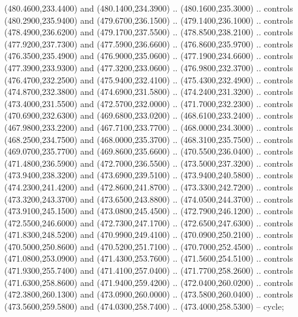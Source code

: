 {\begin{scope}[y=0.80pt, x=0.80pt, yscale=-1, xscale=1, inner sep=0pt, outer sep=0pt, #1]
      (480.4600,233.4400) and (480.1400,234.3900) .. (480.1600,235.3000) .. controls
      (480.2900,235.9400) and (479.6700,236.1500) .. (479.1400,236.1000) .. controls
      (478.4900,236.6200) and (479.1700,237.5500) .. (478.8500,238.2100) .. controls
      (477.9200,237.7300) and (477.5900,236.6600) .. (476.8600,235.9700) .. controls
      (476.3500,235.4900) and (476.9000,235.0600) .. (477.1900,234.6600) .. controls
      (477.3900,233.9300) and (477.3200,233.0600) .. (476.9800,232.3700) .. controls
      (476.4700,232.2500) and (475.9400,232.4100) .. (475.4300,232.4900) .. controls
      (474.8700,232.3800) and (474.6900,231.5800) .. (474.2400,231.3200) .. controls
      (473.4000,231.5500) and (472.5700,232.0000) .. (471.7000,232.2300) .. controls
      (470.6900,232.6300) and (469.6800,233.0200) .. (468.6100,233.2400) .. controls
      (467.9800,233.2200) and (467.7100,233.7700) .. (468.0000,234.3000) .. controls
      (468.2500,234.7500) and (468.0000,235.3700) .. (468.3100,235.7500) .. controls
      (469.0700,235.7700) and (469.8600,235.6600) .. (470.5500,236.0400) .. controls
      (471.4800,236.5900) and (472.7000,236.5500) .. (473.5000,237.3200) .. controls
      (473.9400,238.3200) and (473.6900,239.5100) .. (473.9400,240.5800) .. controls
      (474.2300,241.4200) and (472.8600,241.8700) .. (473.3300,242.7200) .. controls
      (473.3200,243.3700) and (473.6500,243.8800) .. (474.0500,244.3700) .. controls
      (473.9100,245.1500) and (473.0800,245.4500) .. (472.7900,246.1200) .. controls
      (472.5500,246.6000) and (472.7300,247.1700) .. (472.6500,247.6300) .. controls
      (471.8300,248.5200) and (470.9900,249.4100) .. (470.0900,250.2100) .. controls
      (470.5000,250.8600) and (470.5200,251.7100) .. (470.7000,252.4500) .. controls
      (471.0800,253.0900) and (471.4300,253.7600) .. (471.5600,254.5100) .. controls
      (471.9300,255.7400) and (471.4100,257.0400) .. (471.7700,258.2600) .. controls
      (471.6300,258.8600) and (471.9400,259.4200) .. (472.0400,260.0200) .. controls
      (472.3800,260.1300) and (473.0900,260.0000) .. (473.5800,260.0400) .. controls
      (473.5600,259.5800) and (474.0300,258.7400) .. (473.4000,258.5300) -- cycle;


\end{scope}}

